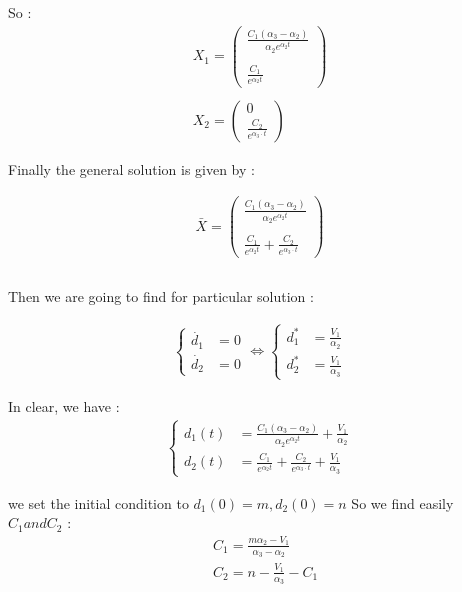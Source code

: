 \documentclass{article}
\begin{document}
	So : 
	\begin{align*}
		X_1=\begin{pmatrix}
			\frac{C_1(\alpha_3-\alpha_2)}{\alpha_2e^{\alpha_2t}} \\ \\
			\frac{C_1}{e^{\alpha_2t}}
		\end{pmatrix} \\ \\ 
		X_2=\begin{pmatrix}
			0 \\
			\frac{C_2}{e^{\alpha_3 \cdot t}}
		\end{pmatrix}
	\end{align*}
	
	Finally the general solution is given by : 
	
	\begin{align*}
		\bar{X}
		=\begin{pmatrix}
			\frac{C_1(\alpha_3-\alpha_2)}{\alpha_2e^{\alpha_2t}} \\ \\
			\frac{C_1}{e^{\alpha_2t}} + \frac{C_2}{e^{\alpha_3 \cdot t}}
		\end{pmatrix} \\ \\ 
	\end{align*}
	
	Then we are going to find for particular solution : 
	
	
	\begin{align*}
		\begin{cases}
			\dot{d_1} &= 0 \\
			\dot{d_2} &= 0
		\end{cases} \iff 
		\begin{cases}
			d_1^* &= \frac{V_1}{\alpha_2} \\
			d_2^* &= \frac{V_1}{\alpha_3}
		\end{cases}
	\end{align*}
	
	In clear, we have : 
	\begin{align*}
		\begin{cases}
			d_1(t) &= \frac{C_1(\alpha_3-\alpha_2)}{\alpha_2e^{\alpha_2t}}+ \frac{V_1}{\alpha_2}\\
			d_2(t) &= \frac{C_1}{e^{\alpha_2t}} + \frac{C_2}{e^{\alpha_3 \cdot t}} + \frac{V_1}{\alpha_3}
		\end{cases}
	\end{align*}
	
	we set the initial condition to \newline 
	$d_1(0)=m, d_2(0)=n$ So we find easily $C_1 and C_2$ : 
	\begin{align*}
		&C_1=\frac{m\alpha_2-V_1}{\alpha_3-\alpha_2} \\
		&C_2=n-\frac{V_1}{\alpha_3} - C_1
	\end{align*}
	
\end{document}
